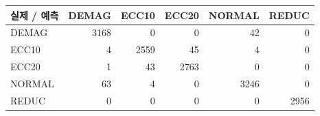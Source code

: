 \begin{tabular}{lrrrrr}
\toprule
실제 / 예측 & DEMAG & ECC10 & ECC20 & NORMAL & REDUC \\
\midrule
DEMAG & 3168 & 0 & 0 & 42 & 0 \\
ECC10 & 4 & 2559 & 45 & 4 & 0 \\
ECC20 & 1 & 43 & 2763 & 0 & 0 \\
NORMAL & 63 & 4 & 0 & 3246 & 0 \\
REDUC & 0 & 0 & 0 & 0 & 2956 \\
\bottomrule
\end{tabular}
